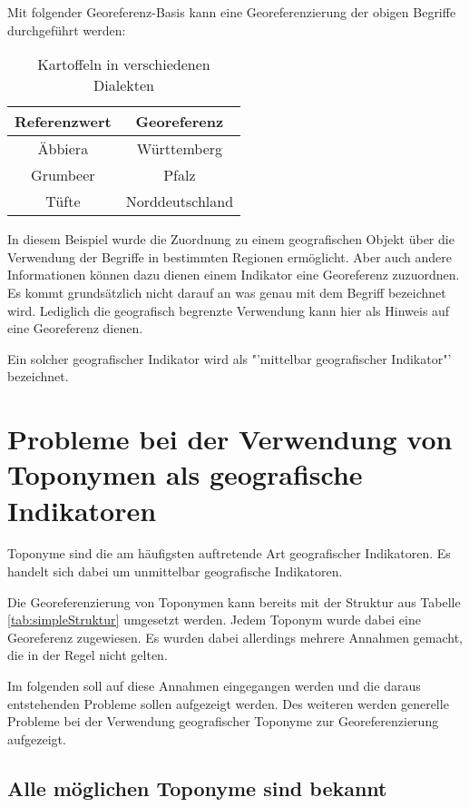 				Mit folgender Georeferenz-Basis kann eine Georeferenzierung der obigen Begriffe durchgeführt werden:

				\begin{table}[htpb]
					\caption{Kartoffeln in verschiedenen Dialekten} 
					\centering
					\begin{tabular}{|c|c|}
						\hline
						Referenzwert & Georeferenz \\
						\hline\hline
						Äbbiera & Württemberg \\
						\hline
						Grumbeer & Pfalz \\
						\hline
						Tüfte & Norddeutschland \\
						\hline
					\end{tabular}
					\label{tab:dialekt} 
				\end{table} 

				In diesem Beispiel wurde die Zuordnung zu einem geografischen Objekt über die Verwendung der Begriffe in bestimmten Regionen ermöglicht.
				Aber auch andere Informationen können dazu dienen einem Indikator eine Georeferenz zuzuordnen.
				Es kommt grundsätzlich nicht darauf an was genau mit dem Begriff bezeichnet wird. 
				Lediglich die geografisch begrenzte Verwendung kann hier als Hinweis auf eine Georeferenz dienen. 

				Ein solcher geografischer Indikator wird als "'mittelbar geografischer Indikator"' bezeichnet. 

	\section{Probleme bei der Verwendung von Toponymen als geografische Indikatoren} \label{sec:topGeogInd} 

		Toponyme sind die am häufigsten auftretende Art geografischer Indikatoren. 
		Es handelt sich dabei um unmittelbar geografische Indikatoren.

		Die Georeferenzierung von Toponymen kann bereits mit der Struktur aus Tabelle \ref{tab:simpleStruktur} umgesetzt werden. 
		Jedem Toponym wurde dabei eine Georeferenz zugewiesen.
		Es wurden dabei allerdings mehrere Annahmen gemacht, die in der Regel nicht gelten.

		Im folgenden soll auf diese Annahmen eingegangen werden und die daraus entstehenden Probleme sollen aufgezeigt werden.
		Des weiteren werden generelle Probleme bei der Verwendung geografischer Toponyme zur Georeferenzierung aufgezeigt.

		\subsection{Alle möglichen Toponyme sind bekannt}

